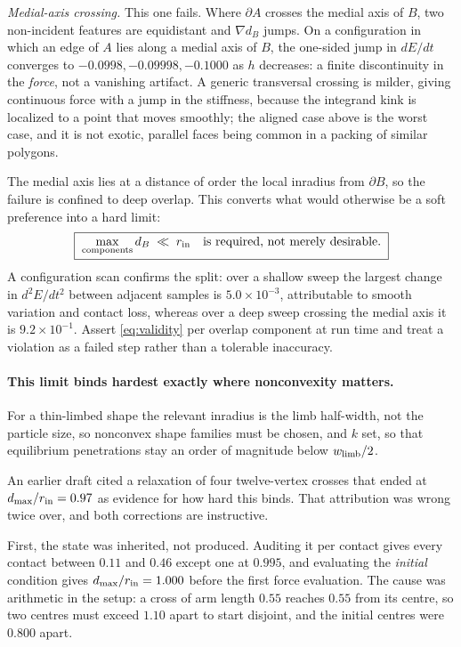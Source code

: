 \documentclass[11pt]{article}
\begin{document}
\emph{Medial-axis crossing.} This one fails. Where $\partial A$ crosses the medial axis of $B$, two non-incident features are equidistant and $\nabla d_B$ jumps. On a configuration in which an edge of $A$ lies along a medial axis of $B$, the one-sided jump in $dE/dt$ converges to $-0.0998, -0.09998, -0.1000$ as $h$ decreases: a finite discontinuity in the \emph{force}, not a vanishing artifact. A generic transversal crossing is milder, giving continuous force with a jump in the stiffness, because the integrand kink is localized to a point that moves smoothly; the aligned case above is the worst case, and it is not exotic, parallel faces being common in a packing of similar polygons.

The medial axis lies at a distance of order the local inradius from $\partial B$, so the failure is confined to deep overlap. This converts what would otherwise be a soft preference into a hard limit:
\begin{equation}
\boxed{\;\max_{\rm components} d_B \;\ll\; r_{\rm in} \quad\text{is required, not merely desirable.}\;}
\label{eq:validity}
\end{equation}
A configuration scan confirms the split: over a shallow sweep the largest change in $d^2E/dt^2$ between adjacent samples is $5.0\times10^{-3}$, attributable to smooth variation and contact loss, whereas over a deep sweep crossing the medial axis it is $9.2\times10^{-1}$. Assert \eqref{eq:validity} per overlap component at run time and treat a violation as a failed step rather than a tolerable inaccuracy.

\paragraph{This limit binds hardest exactly where nonconvexity matters.} For a thin-limbed shape the relevant inradius is the limb half-width, not the particle size, so nonconvex shape families must be chosen, and $k$ set, so that equilibrium penetrations stay an order of magnitude below $w_{\rm limb}/2$.

An earlier draft cited a relaxation of four twelve-vertex crosses that ended at $d_{\max}/r_{\rm in} = 0.97$ as evidence for how hard this binds. That attribution was wrong twice over, and both corrections are instructive.

First, the state was inherited, not produced. Auditing it per contact gives every contact between $0.11$ and $0.46$ except one at $0.995$, and evaluating the \emph{initial} condition gives $d_{\max}/r_{\rm in} = 1.000$ before the first force evaluation. The cause was arithmetic in the setup: a cross of arm length $0.55$ reaches $0.55$ from its centre, so two centres must exceed $1.10$ apart to start disjoint, and the initial centres were $0.800$ apart.
\end{document}
